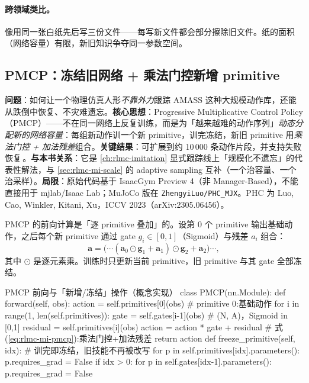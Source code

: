 \paragraph{跨领域类比。}像用同一张白纸先后写三份文件——每写新文件都会部分擦除旧文件。纸的面积（网络容量）有限，新旧知识争夺同一参数空间。

\subsection{PMCP：冻结旧网络 + 乘法门控新增 primitive}
\label{sec:rlmc-mi-phc-pmcp}

\begin{paper}\label{paper:rlmc-mi-phc}
\textbf{问题}：如何让一个物理仿真人形\emph{不靠外力}跟踪 AMASS 这种大规模动作库，还能从跌倒中恢复、不灾难遗忘。\textbf{核心思想}：Progressive Multiplicative Control Policy（PMCP）——不在同一网络上反复训练，而是为「越来越难的动作序列」\emph{动态分配新的网络容量}：每组新动作训一个新 primitive，训完冻结，新旧 primitive 用\emph{乘法门控 + 加法残差}组合。\textbf{关键结果}：可扩展到约 10\,000 条动作片段，并支持失败恢复\,\cite{luo2023phc}。\textbf{与本书关系}：它是 \cref{ch:rlmc-imitation} 显式跟踪线上「规模化不遗忘」的代表性解法，与 \cref{sec:rlmc-mi-scale} 的 adaptive sampling 互补（一个治容量、一个治采样）。\textbf{局限}：原始代码基于 IsaacGym Preview 4（非 Manager-Based），不能直接用于 mjlab/Isaac Lab；MuJoCo 版在 \texttt{ZhengyiLuo/\allowbreak PHC\_MJX}。PHC 为 Luo, Cao, Winkler, Kitani, Xu，ICCV 2023（arXiv:2305.06456）。
\end{paper}

PMCP 的前向计算是「逐 primitive 叠加」的。设第 0 个 primitive 输出基础动作，之后每个新 primitive 通过 gate $g_i\in[0,1]$（Sigmoid）与残差 $a_i$ 组合：
\begin{equation}
\mathbf{a} = \big(\cdots(\mathbf{a}_0\odot \mathbf{g}_1 + \mathbf{a}_1)\odot \mathbf{g}_2 + \mathbf{a}_2\big)\cdots,
\label{eq:rlmc-mi-pmcp}
\end{equation}
其中 $\odot$ 是逐元素乘。训练时只更新当前 primitive，旧 primitive 与其 gate 全部冻结。

\begin{codebox}[Python]{PMCP 前向与「新增/冻结」操作（概念实现）}
class PMCP(nn.Module):
    def forward(self, obs):
        action = self.primitives[0](obs)                  # primitive 0:基础动作
        for i in range(1, len(self.primitives)):
            gate = self.gates[i-1](obs)                    # (N, A)，Sigmoid in [0,1]
            residual = self.primitives[i](obs)
            action = action * gate + residual             # 式(\ref{eq:rlmc-mi-pmcp}):乘法门控+加法残差
        return action
    def freeze_primitive(self, idx):                       # 训完即冻结，旧技能不再被改写
        for p in self.primitives[idx].parameters(): p.requires_grad = False
        if idx > 0:
            for p in self.gates[idx-1].parameters(): p.requires_grad = False
\end{codebox}

